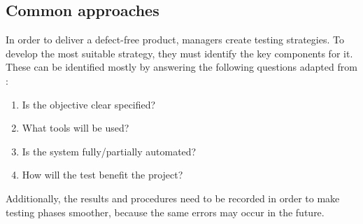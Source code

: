 \subsection{Common approaches}
In order to deliver a defect-free product, managers create testing strategies.
To develop the most suitable strategy, they must identify the key components for it. These can be identified mostly by answering the following questions adapted from \cite{10.1007/978-981-10-8848-3_46}:
\begin{enumerate}
	\item Is the objective clear specified?
	\item What tools will be used?
	\item Is the system fully/partially automated?
	\item How will the test benefit the project?
\end{enumerate}
Additionally, the results and procedures need to be recorded in order to make testing phases smoother, because the same errors may occur in the future.
% 
